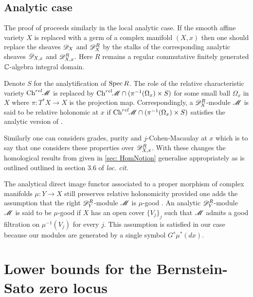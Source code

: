 \subsection{Analytic case}
The proof of  proceeds similarly in the local analytic case.
If the smooth affine variety $X$ is replaced with a germ of a complex manifold $(X,x)$ then one should replace the sheaves $\mathscr{D}_X$ and $\mathscr{D}_X^R$ by the stalks of the corresponding analytic sheaves $\mathscr{D}_{X,x}$ and $\mathscr{D}_{X,x}^R$.
Here $R$ remains a regular commutative finitely generated $\mathbb{C}$-algebra integral domain.

Denote $S$ for the analytification of $\operatorname{Spec} R$.
The role of the relative characteristic variety $\operatorname{Ch}^{rel}\mkern-5mu\mathscr{M}$ is replaced by $\operatorname{Ch}^{rel}\mkern-5mu\mathscr{M} \cap (\pi^{-1}(\Omega_x)\times S)$ for some small ball $\Omega_x$ in $X$ where $\pi:T^*X\to X$ is the projection map.
Correspondingly, a $\mathscr{D}_X^R$-module $\mathscr{M}$ is said to be relative holonomic at $x$ if $\operatorname{Ch}^{rel}\mkern-5mu\mathscr{M} \cap (\pi^{-1}(\Omega_x)\times S)$ satisfies the analytic version of .

Similarly one can considers grades, purity and $j$-Cohen-Macaulay at $x$ which is to say that one considers these properties over $\mathscr{D}_{X,x}^R$.
With these changes the homological results from \cite{budur2020zeroI} given in \cref{sec: HomNotion} generalise appropriately as is outlined outlined in section 3.6 of {\it loc. cit.}

The analytical direct image functor associated to a proper morphism of complex manifolds $\mu:Y\to X$ still preserves relative holonomicity provided one adds the assumption that the right $\mathscr{D}_Y^R$-module $\mathscr{M}$ is $\mu$-good \cite[Theorem 1.17]{AnalyticDirectIm}.
An analytic $\mathscr{D}_Y^R$-module $\mathscr{M}$ is said to be $\mu$-good if $X$ has an open cover $\{V_j\}_j$ such that $\mathscr{M}$ admits a good filtration on $\mu^{-1}(V_j)$ for every $j$.
This assumption is satisfied in our case because our modules are generated by a single symbol $G^s\mu^*(dx)$.
\section{Lower bounds for the Bernstein-Sato zero locus}\label{sec: LowerBound}
